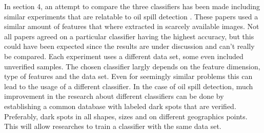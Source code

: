 In section 4, an attempt to compare the three classifiers has been made including similar experiments that are relatable to oil spill detection . These papers used a similar amount of features that where extracted in scarcely available images. Not all papers agreed on a particular classifier having the highest accuracy, but this could have been expected since the results are under discussion and can't really be compared. Each experiment uses a different data set, some even included unverified samples. The chosen classifier largly depends on the feature dimension, type of features and the data set. Even for seemingly similar problems this can lead to the usage of a different classifier. In the case of oil spill detection, much improvement in the research about different classifiers can be done by establishing a common database with labeled dark spots that are verified. Preferably, dark spots in all shapes, sizes and on different geographics points. This will allow researches to train a classifier with the same data set.